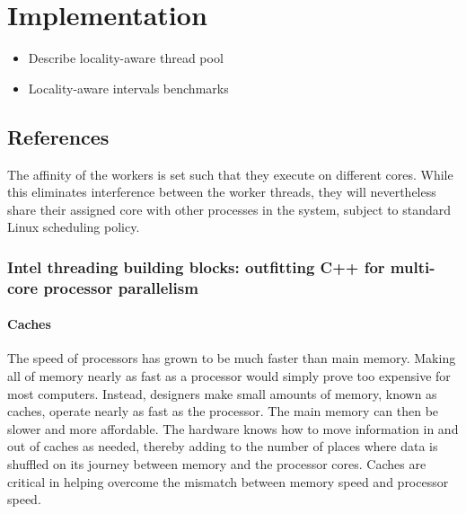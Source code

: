 
\chapter{Implementation}
\label{chap:locality-implementation}


\begin{itemize}
\item Describe locality-aware thread pool
\item Locality-aware intervals benchmarks
\end{itemize}

\section{References}

The affinity of the workers is set such that they execute on different
cores. While this eliminates interference between the worker threads,
they will nevertheless share their assigned core with other processes
in the system, subject to standard Linux scheduling policy.

\subsection{Intel threading building blocks: outfitting C++ for
  multi-core processor parallelism \cite{Reinders2007}}

\subsubsection{Caches}

The speed of processors has grown to be much faster than main
memory. Making all of memory nearly as fast as a processor would
simply prove too expensive for most computers. Instead, designers make
small amounts of memory, known as caches, operate nearly as fast as
the processor. The main memory can then be slower and more
affordable. The hardware knows how to move information in and out of
caches as needed, thereby adding to the number of places where data is
shuffled on its journey between memory and the processor cores. Caches
are critical in helping overcome the mismatch between memory speed and
processor speed.

